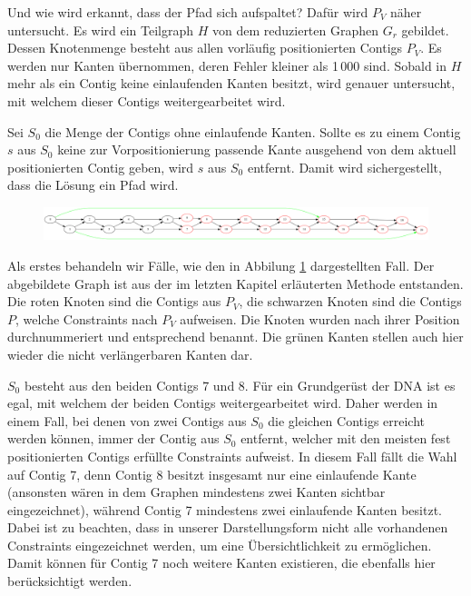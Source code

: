 Und wie wird erkannt, dass der Pfad sich aufspaltet? Dafür wird $P_V$ näher untersucht.
Es wird ein Teilgraph $H$ von dem reduzierten Graphen $G_r$ gebildet.
Dessen Knotenmenge besteht aus allen vorläufig positionierten Contigs $P_V$. 
Es werden nur Kanten übernommen, deren Fehler kleiner als 1\,000 sind. Sobald in $H$ mehr als ein Contig keine einlaufenden Kanten besitzt, wird genauer untersucht, mit welchem dieser Contigs weitergearbeitet wird.

Sei $S_0$ die Menge der Contigs ohne einlaufende Kanten. Sollte es zu einem Contig $s$ aus $S_0$ keine zur Vorpositionierung passende Kante 
ausgehend von dem aktuell positionierten Contig 
geben, wird $s$ aus $S_0$ entfernt. Damit wird sichergestellt, dass die Lösung ein Pfad 
wird.

\begin{figure}
	\begin{center}
		\includegraphics[width=1\textwidth]{bilder/msplit3}
	\end{center}
	\label{msplit}
	\caption{}
\end{figure}

Als erstes behandeln wir Fälle, wie den in Abbilung \ref{msplit} dargestellten Fall. Der abgebildete Graph ist aus der im letzten Kapitel erläuterten Methode entstanden. Die roten Knoten sind die Contigs aus $P_V$, die schwarzen Knoten sind die Contigs $P$, welche Constraints nach $P_V$ aufweisen. Die Knoten wurden nach ihrer Position durchnummeriert und entsprechend benannt. 
Die grünen Kanten stellen auch hier wieder die nicht verlängerbaren Kanten dar.


$S_0$ besteht aus den beiden Contigs 7 und 8. Für ein Grundgerüst der DNA ist es egal, mit welchem der beiden Contigs weitergearbeitet wird. Daher werden in einem Fall, bei denen von zwei Contigs aus $S_0$ die gleichen Contigs erreicht werden können, immer der Contig aus $S_0$ entfernt, welcher mit den meisten fest positionierten Contigs erfüllte Constraints aufweist. 
In diesem Fall fällt die Wahl auf Contig 7, denn Contig 8 besitzt insgesamt nur eine einlaufende Kante (ansonsten wären in dem Graphen mindestens zwei Kanten sichtbar eingezeichnet), während Contig 7 mindestens zwei einlaufende Kanten besitzt. Dabei ist zu beachten, dass in unserer Darstellungsform nicht alle vorhandenen Constraints eingezeichnet werden, um eine Übersichtlichkeit zu ermöglichen. Damit können für Contig 7 noch weitere Kanten existieren, die ebenfalls hier berücksichtigt werden. 


